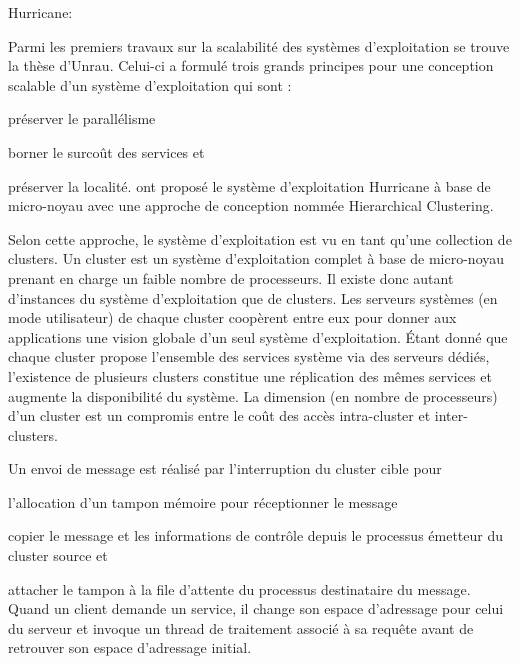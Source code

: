       \begin{paragraph}{Hurricane:}

        Parmi les premiers travaux sur la scalabilité des systèmes
        d’exploitation se trouve la thèse d’Unrau. Celui-ci a formulé trois
        grands principes pour une conception scalable d’un système
        d’exploitation qui sont : \benumline \item préserver le
        parallélisme \item borner le surcoût des services et \item préserver la
        localité\eenumline. \citet{unrau1995hierarchical} ont proposé le système
        d’exploitation Hurricane à base de micro-noyau avec une approche de
        conception nommée Hierarchical Clustering.\newline

        Selon cette approche, le système d’exploitation est vu en tant qu’une
        collection de clusters. Un cluster est un système d’exploitation complet
        à base de micro-noyau prenant en charge un faible nombre de
        processeurs. Il existe donc autant d’instances du système d’exploitation
        que de clusters. Les serveurs systèmes (en mode utilisateur) de chaque
        cluster coopèrent entre eux pour donner aux applications une vision
        globale d’un seul système d’exploitation. Étant donné que chaque cluster
        propose l’ensemble des services système via des serveurs dédiés,
        l’existence de plusieurs clusters constitue une réplication des mêmes
        services et augmente la disponibilité du système. La dimension (en
        nombre de processeurs) d’un cluster est un compromis entre le coût des
        accès intra-cluster et inter-clusters.\newline



        Un envoi de message est réalisé par l’interruption du cluster cible
        pour\benumline \item l’allocation d’un tampon mémoire pour réceptionner
        le message \item copier le message et les informations de contrôle
        depuis le processus émetteur du cluster source et \item attacher le
        tampon à la file d’attente du processus destinataire du
        message\eenumline. Quand un client demande un service, il change son
        espace d’adressage pour celui du serveur et invoque un thread de
        traitement associé à sa requête avant de retrouver son espace
        d’adressage initial.

      \end{paragraph}
      
